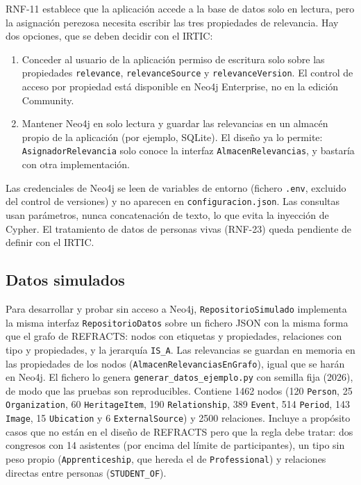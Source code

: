 RNF-11 establece que la aplicación accede a la base de datos solo en lectura, pero la asignación perezosa necesita escribir las tres propiedades de relevancia. Hay dos opciones, que se deben decidir con el IRTIC:
\begin{enumerate}
  \item Conceder al usuario de la aplicación permiso de escritura solo sobre las propiedades \texttt{relevance}, \texttt{relevanceSource} y \texttt{relevanceVersion}. El control de acceso por propiedad está disponible en Neo4j Enterprise, no en la edición Community. \cite{TODO}
  \item Mantener Neo4j en solo lectura y guardar las relevancias en un almacén propio de la aplicación (por ejemplo, SQLite). El diseño ya lo permite: \texttt{AsignadorRelevancia} solo conoce la interfaz \texttt{AlmacenRelevancias}, y bastaría con otra implementación.
\end{enumerate}

Las credenciales de Neo4j se leen de variables de entorno (fichero \texttt{.env}, excluido del control de versiones) y no aparecen en \texttt{configuracion.json}. Las consultas usan parámetros, nunca concatenación de texto, lo que evita la inyección de Cypher. El tratamiento de datos de personas vivas (RNF-23) queda pendiente de definir con el IRTIC. %

\subsection{Datos simulados}

Para desarrollar y probar sin acceso a Neo4j, \texttt{RepositorioSimulado} implementa la misma interfaz \texttt{RepositorioDatos} sobre un fichero JSON con la misma forma que el grafo de REFRACTS: nodos con etiquetas y propiedades, relaciones con tipo y propiedades, y la jerarquía \texttt{IS\_A}. Las relevancias se guardan en memoria en las propiedades de los nodos (\texttt{AlmacenRelevanciasEnGrafo}), igual que se harán en Neo4j. El fichero lo genera \texttt{generar\_datos\_ejemplo.py} con semilla fija (2026), de modo que las pruebas son reproducibles. Contiene 1462 nodos (120 \texttt{Person}, 25 \texttt{Organization}, 60 \texttt{HeritageItem}, 190 \texttt{Relationship}, 389 \texttt{Event}, 514 \texttt{Period}, 143 \texttt{Image}, 15 \texttt{Ubication} y 6 \texttt{ExternalSource}) y 2500 relaciones. Incluye a propósito casos que no están en el diseño de REFRACTS pero que la regla debe tratar: dos congresos con 14 asistentes (por encima del límite de participantes), un tipo sin peso propio (\texttt{Apprenticeship}, que hereda el de \texttt{Professional}) y relaciones directas entre personas (\texttt{STUDENT\_OF}).


